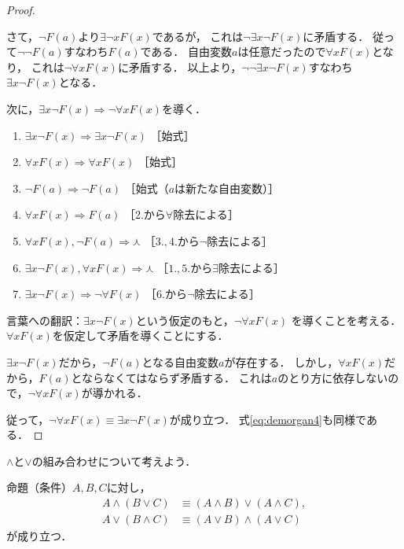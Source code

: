 \begin{proof}
\begin{oframed}
       さて，$\lnot F(a)$より$\exists \lnot x F(x)$であるが，
       これは$\lnot \exists x \lnot F(x)$に矛盾する．
       従って$\lnot \lnot F(a)$すなわち$F(a)$である．
       自由変数$a$は任意だったので$\forall x F(x)$となり，
       これは$\lnot \forall x F(x)$に矛盾する．
       以上より，$\lnot \lnot \exists x \lnot F(x) $すなわち$\exists x \lnot F(x)$となる．
     \end{oframed}

     次に，$\exists x \lnot F(x) \Longrightarrow \lnot \forall x F(x) $を導く．
     \begin{enumerate}[1. ]
       \item $\exists x \lnot F(x) \Longrightarrow \exists x \lnot F(x)$
              \quad ［始式］
       \item $\forall x F(x) \Longrightarrow \forall x F(x) $
              \quad ［始式］
       \item $\lnot F(a) \Longrightarrow \lnot F(a) $ \quad ［始式（$a$は新たな自由変数）］
       \item $\forall x F(x) \Longrightarrow F(a)$ \quad ［2.から$\forall$除去による］
       \item $\forall x F(x) ,  \lnot F(a) \Longrightarrow \curlywedge$
              \quad ［$3., 4.$から$\lnot$除去による］
       \item $\exists x \lnot F(x) ,  \forall x F(x) \Longrightarrow \curlywedge$
              \quad ［$1., 5.$から$\exists$除去による］
       \item $\exists x \lnot F(x) \Longrightarrow \lnot \forall F(x)$
              \quad ［6.から$\lnot$除去による］
     \end{enumerate}
     \begin{oframed}
       言葉への翻訳：$\exists x \lnot F(x)$という仮定のもと，$\lnot \forall x F(x)$
       を導くことを考える．$\forall x F(x)$を仮定して矛盾を導くことにする．

       $\exists x \lnot F(x)$だから，$\lnot F(a)$となる自由変数$a$が存在する．
       しかし，$\forall x F(x)$だから，$F(a)$とならなくてはならず矛盾する．
       これは$a$のとり方に依存しないので，$\lnot \forall x F(x)$が導かれる．
     \end{oframed}
     従って，$\lnot \forall x F(x) \equiv \exists x \lnot F(x)$が成り立つ．
     式\eqref{eq:demorgan4}も同様である．
   \end{proof}
   $\land$と$\lor$の組み合わせについて考えよう．
   \begin{thm}[命題論理における分配律] \label{thm:bunpaimeidai}
     命題（条件）$A,  B,  C$に対し，
     \begin{align}
       A \land ( B \lor C ) & \equiv (A \land B ) \lor (A \land C) ,
       \label{eq:bunpailand} \\
       A \lor ( B \land C) & \equiv (A \lor B) \land ( A \lor C )
       \label{eq:bunpailor}
     \end{align}
     が成り立つ．
   \end{thm}
